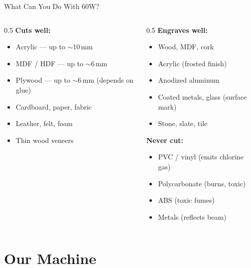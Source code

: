 \documentclass[aspectratio=169]{beamer}
\begin{document}
\begin{frame}{What Can You Do With 60W?}
\begin{columns}
\begin{column}{0.5\textwidth}
\textbf{Cuts well:}
\begin{itemize}
    \item Acrylic --- up to $\sim$10\,mm
    \item MDF / HDF --- up to $\sim$6\,mm
    \item Plywood --- up to $\sim$6\,mm (depends on glue)
    \item Cardboard, paper, fabric
    \item Leather, felt, foam
    \item Thin wood veneers
\end{itemize}
\end{column}
\begin{column}{0.5\textwidth}
\textbf{Engraves well:}
\begin{itemize}
    \item Wood, MDF, cork
    \item Acrylic (frosted finish)
    \item Anodized aluminum
    \item Coated metals, glass (surface mark)
    \item Stone, slate, tile
\end{itemize}
\vspace{1em}
\alert{\textbf{Never cut:}}
\begin{itemize}
    \item PVC / vinyl (emits chlorine gas)
    \item Polycarbonate (burns, toxic)
    \item ABS (toxic fumes)
    \item Metals (reflects beam)
\end{itemize}
\end{column}
\end{columns}
\end{frame}

\section{Our Machine}
\end{document}
